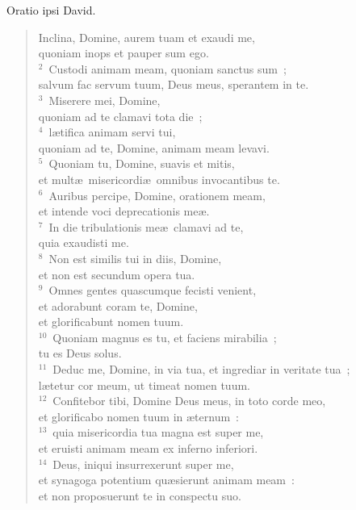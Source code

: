 \lettrine[lines=3,image=true,loversize=0.05,lraise=-0.03]{O}{}ratio ipsi David. \begin{flushleft}\begin{verse}\vspace{6pt}Inclina, Domine, aurem tuam et exaudi me,\\ quoniam inops et pauper sum ego.\\
${}^{2}$~Custodi animam meam, quoniam sanctus sum~;\\ salvum fac servum tuum, Deus meus, sperantem in te.\\
${}^{3}$~Miserere mei, Domine,\\ quoniam ad te clamavi tota die~;\\
${}^{4}$~l\ae tifica animam servi tui,\\ quoniam ad te, Domine, animam meam levavi.\\
${}^{5}$~Quoniam tu, Domine, suavis et mitis,\\ et mult\ae\ misericordi\ae\ omnibus invocantibus te.\\
${}^{6}$~Auribus percipe, Domine, orationem meam,\\ et intende voci deprecationis me\ae .\\
${}^{7}$~In die tribulationis me\ae\ clamavi ad te,\\ quia exaudisti me.\\
${}^{8}$~Non est similis tui in diis, Domine,\\ et non est secundum opera tua.\\
${}^{9}$~Omnes gentes quascumque fecisti venient,\\ et adorabunt coram te, Domine,\\ et glorificabunt nomen tuum.\\
${}^{10}$~Quoniam magnus es tu, et faciens mirabilia~;\\ tu es Deus solus.\\
${}^{11}$~Deduc me, Domine, in via tua, et ingrediar in veritate tua~;\\ l\ae tetur cor meum, ut timeat nomen tuum.\\
${}^{12}$~Confitebor tibi, Domine Deus meus, in toto corde meo,\\ et glorificabo nomen tuum in \ae ternum~:\\
${}^{13}$~quia misericordia tua magna est super me,\\ et eruisti animam meam ex inferno inferiori.\\
${}^{14}$~Deus, iniqui insurrexerunt super me,\\ et synagoga potentium qu\ae sierunt animam meam~:\\ et non proposuerunt te in conspectu suo.\\

\end{verse}
\end{flushleft}
